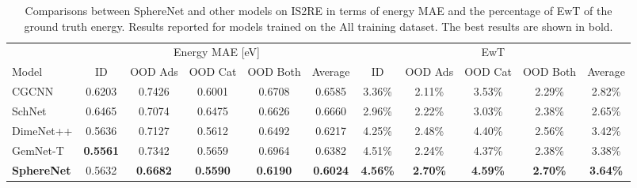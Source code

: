 \documentclass{article}
\begin{document}
\begin{table*}[t]
    \begin{center}
        \caption{Comparisons between SphereNet and other models on IS2RE in terms of energy MAE and the percentage of EwT of the ground truth energy. Results reported for models trained on the All training dataset. The best results are shown in bold.}
    \label{tb:oc20}
    \resizebox{\textwidth}{!}
            {\begin{tabular}{l ccccc | ccccc  }
            \bottomrule
            &\multicolumn{5}{c|}{Energy MAE [eV] } & \multicolumn{5}{c}{EwT }  \\
            \cmidrule(l{4pt}r{4pt}){2-6}
            \cmidrule(l{4pt}r{4pt}){7-11}
         Model & ID &  OOD Ads & OOD Cat & OOD Both &Average& ID &  OOD Ads & OOD Cat & OOD Both &Average\\
                \midrule
               CGCNN
                    & 0.6203 & 0.7426 & 0.6001& 0.6708& 0.6585
                    & 3.36\% & 2.11\% & 3.53\% & 2.29\% & 2.82\% \\
                 SchNet
                    & 0.6465 & 0.7074& 0.6475 & 0.6626& 0.6660
                    & 2.96\% & 2.22\% &3.03\%& 2.38\% & 2.65\% \\
                 DimeNet++
                    & 0.5636 & 0.7127 & 0.5612& 0.6492& 0.6217
                    & 4.25\% & 2.48\%& 4.40\%& 2.56\% & 3.42\%\\
                GemNet-T
                    & \textbf{0.5561} & 0.7342 & 0.5659& 0.6964& 0.6382
                    & 4.51\% & 2.24\%& 4.37\%& 2.38\% & 3.38\%\\
                 \textbf{SphereNet}
                    & 0.5632 & \textbf{0.6682} & \textbf{0.5590} & \textbf{0.6190}& \textbf{0.6024}
                    & \textbf{4.56\%} & \textbf{2.70\%} & \textbf{4.59\%} & \textbf{2.70\%}& \textbf{3.64\%} \\
            \bottomrule
            \end{tabular}}
            \vspace{-10pt}
    \end{center}
\end{table*}
\setlength{\tabcolsep}{1.4pt}
\end{document}
